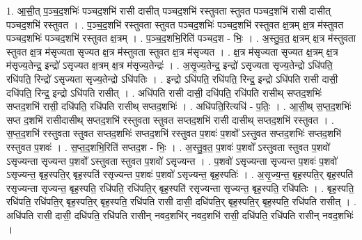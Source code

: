 \documentclass[17pt]{extarticle}
\begin{document}
1. आ॒सी॒त् प॒ञ्च॒द॒शभिः॑ पञ्चद॒शभि॑ रासी दासीत् पञ्चद॒शभि॑ रस्तुवता स्तुवत पञ्चद॒शभि॑ रासी दासीत् पञ्चद॒शभि॑ रस्तुवत । . प॒ञ्च॒द॒शभि॑ रस्तुवता स्तुवत पञ्चद॒शभिः॑ पञ्चद॒शभि॑ रस्तुवत क्ष॒त्रम् क्ष॒त्र म॑स्तुवत पञ्चद॒शभिः॑ पञ्चद॒शभि॑ रस्तुवत क्ष॒त्रम् । . प॒ञ्च॒द॒शभि॒रिति॑ पञ्चद॒श - भिः॒ । . अ॒स्तु॒व॒त॒ क्ष॒त्रम् क्ष॒त्र म॑स्तुवता स्तुवत क्ष॒त्र म॑सृज्यता सृज्यत क्ष॒त्र म॑स्तुवता स्तुवत क्ष॒त्र म॑सृज्यत । . क्ष॒त्र म॑सृज्यता सृज्यत क्ष॒त्रम् क्ष॒त्र म॑सृज्य॒तेन्द्र॒ इन्द्रो॑ ऽसृज्यत क्ष॒त्रम् क्ष॒त्र 
म॑सृज्य॒तेन्द्रः॑ । . अ॒सृ॒ज्य॒तेन्द्र॒ इन्द्रो॑ ऽसृज्यता सृज्य॒तेन्द्रो ऽधि॑पति॒ रधि॑पति॒ रिन्द्रो॑ ऽसृज्यता सृज्य॒तेन्द्रो ऽधि॑पतिः । . इन्द्रो ऽधि॑पति॒ रधि॑पति॒ रिन्द्र॒ इन्द्रो ऽधि॑पति रासी दासी॒ दधि॑पति॒ रिन्द्र॒ इन्द्रो ऽधि॑पति रासीत् । . अधि॑पति रासी दासी॒ दधि॑पति॒ रधि॑पति रासीथ् सप्तद॒शभिः॑ सप्तद॒शभि॑ रासी॒ दधि॑पति॒ रधि॑पति रासीथ् सप्तद॒शभिः॑ । . अधि॑पति॒रित्यधि॑ - प॒तिः॒ । . आ॒सी॒थ् स॒प्त॒द॒शभिः॑ सप्त द॒शभि॑ रासीदासीथ् सप्तद॒शभि॑ रस्तुवता स्तुवत सप्तद॒शभि॑ रासी दासीथ् सप्तद॒शभि॑ रस्तुवत । . स॒प्त॒द॒शभि॑ रस्तुवता स्तुवत सप्तद॒शभिः॑ सप्तद॒शभि॑ रस्तुवत प॒शवः॑ प॒शवो᳚ ऽस्तुवत सप्तद॒शभिः॑ सप्तद॒शभि॑ रस्तुवत प॒शवः॑ । . स॒प्त॒द॒शभि॒रिति॑ सप्तद॒श - भिः॒ । . अ॒स्तु॒व॒त॒ प॒शवः॑ प॒शवो᳚ ऽस्तुवता स्तुवत प॒शवो॑ ऽसृज्यन्ता सृज्यन्त प॒शवो᳚ ऽस्तुवता स्तुवत प॒शवो॑ ऽसृज्यन्त । . प॒शवो॑ ऽसृज्यन्ता सृज्यन्त प॒शवः॑ प॒शवो॑ ऽसृज्यन्त॒ बृह॒स्पति॒र् बृह॒स्पति॑ रसृज्यन्त प॒शवः॑ प॒शवो॑ ऽसृज्यन्त॒ बृह॒स्पतिः॑ । . अ॒सृ॒ज्य॒न्त॒ बृह॒स्पति॒र् बृह॒स्पति॑ रसृज्यन्ता सृज्यन्त॒ बृह॒स्पति॒ रधि॑पति॒ रधि॑पति॒र् बृह॒स्पति॑ रसृज्यन्ता सृज्यन्त॒ बृह॒स्पति॒ रधि॑पतिः । . बृह॒स्पति॒ रधि॑पति॒ रधि॑पति॒र् बृह॒स्पति॒र् बृह॒स्पति॒ रधि॑पति रासी दासी॒ दधि॑पति॒र् बृह॒स्पति॒र् बृह॒स्पति॒ रधि॑पति रासीत् । . अधि॑पति रासी दासी॒ दधि॑पति॒ रधि॑पति रासीन् नवद॒शभि॑र् नवद॒शभि॑ रासी॒ दधि॑पति॒ रधि॑पति रासीन् नवद॒शभिः॑ । \newline
\end{document}
